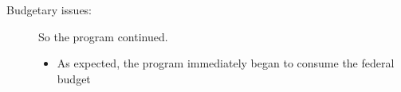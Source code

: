 \documentclass[12pt]{article}
\begin{document}
\begin{description}
\begin{description}
        

      \item[Budgetary issues:] So the program continued.
        \begin{itemize}

          \item As expected, the program immediately began to consume the
            federal budget


\end{itemize}
\end{description}
\end{description}
\end{document}
